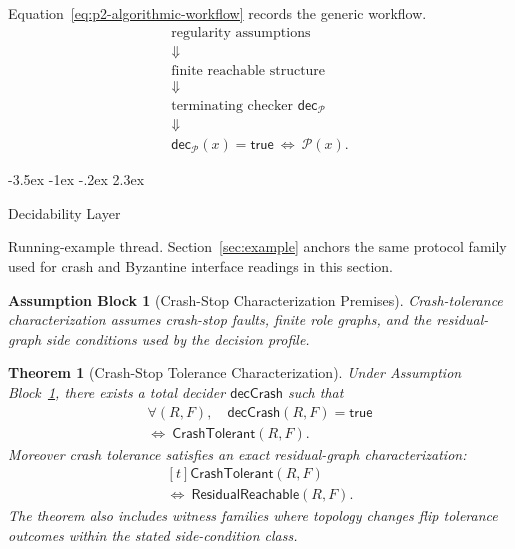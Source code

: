 \documentclass[a4paper,10pt,twocolumn,english]{article}
\makeatletter
\renewcommand{\section}{\@startsection{section}{1}{\z@}%
  {-3.5ex \@plus -1ex \@minus -.2ex}%
  {2.3ex}%
  {\raggedright\normalfont\large\bfseries}}
\numberwithin{equation}{section}
\theoremstyle{paperdef}
\theoremstyle{paperplain}
\newtheorem{theorem}[definition]{Theorem}
\theoremstyle{paperdef}
\newtheorem{assumption}{Assumption Block}[section]
\theoremstyle{paperremark}
\makeatother
\begin{document}
Equation~\ref{eq:p2-algorithmic-workflow} records the generic workflow.
\begin{equation}
	\label{eq:p2-algorithmic-workflow}
	\begin{array}{c}
		\text{regularity assumptions}
		\\
		\Downarrow
		\\
		\text{finite reachable structure}
		\\
		\Downarrow
		\\
		\text{terminating checker } \mathsf{dec}_{\mathcal{P}}
		\\
		\Downarrow
		\\
		\mathsf{dec}_{\mathcal{P}}(x)=\mathsf{true}\ \Longleftrightarrow\ \mathcal{P}(x).
	\end{array}
\end{equation}

\section{Decidability Layer}
\label{sec:decidability}

Running-example thread. Section~\ref{sec:example} anchors the same protocol
family used for crash and Byzantine interface readings in this section.

\begin{assumption}[Crash-Stop Characterization Premises]
	\label{assump:p2-crash}
	Crash-tolerance characterization assumes crash-stop faults, finite role graphs, and the residual-graph side conditions used by the decision profile.
\end{assumption}

\begin{theorem}[Crash-Stop Tolerance Characterization]
	\label{thm:crash}
	Under Assumption Block~\ref{assump:p2-crash}, there exists a total decider $\mathsf{decCrash}$ such that
	\begin{equation}
		\begin{aligned}
			\forall (R,F),\quad
			\mathsf{decCrash}(R,F) = \mathsf{true}
			\\
			\iff\ \mathsf{CrashTolerant}(R,F).
		\end{aligned}
	\end{equation}
	Moreover crash tolerance satisfies an exact residual-graph characterization:
	\begin{equation}
		\begin{aligned}[t]
			\mathsf{CrashTolerant}(R,F)
			\\
			\iff\ \mathsf{ResidualReachable}(R,F).
		\end{aligned}
	\end{equation}
	The theorem also includes witness families where topology changes flip tolerance outcomes within the stated side-condition class.
\end{theorem}
\end{document}

